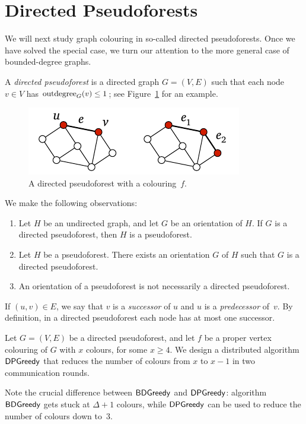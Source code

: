 \section{Directed Pseudoforests}

We will next study graph colouring in so-called directed pseudoforests. Once we have solved the special case, we turn our attention to the more general case of bounded-degree graphs.

A \emph{directed pseudoforest} is a directed graph $G = (V,E)$ such that each node $v \in V$ has $\operatorname{outdegree}_G(v) \le 1$; see Figure~\ref{fig:dp} for an example.

\begin{figure}
    \centering
    \includegraphics[page=\PDP]{figs.pdf}
    \caption{A directed pseudoforest with a colouring~$f$.}\label{fig:dp}
\end{figure}

We make the following observations:
\begin{enumerate}
    \item Let $H$ be an undirected graph, and let $G$ be an orientation of $H$. If $G$ is a directed pseudoforest, then $H$ is a pseudoforest.
    \item Let $H$ be a pseudoforest. There exists an orientation $G$ of $H$ such that $G$ is a directed pseudoforest.
    \item An orientation of a pseudoforest is not necessarily a directed pseudoforest.
\end{enumerate}
If $(u,v) \in E$, we say that $v$ is a \emph{successor} of $u$ and $u$ is a \emph{predecessor} of~$v$. By definition, in a directed pseudoforest each node has at most one successor.


\label{sec:dpgreedy}

Let $G = (V,E)$ be a directed pseudoforest, and let $f$ be a proper vertex colouring of $G$ with $x$ colours, for some $x \ge 4$. We design a distributed algorithm $\textsf{DPGreedy}$ that reduces the number of colours from $x$ to $x-1$ in two communication rounds.

Note the crucial difference between $\textsf{BDGreedy}$ and $\textsf{DPGreedy}$: algorithm $\textsf{BDGreedy}$ gets stuck at $\Delta+1$ colours, while $\textsf{DPGreedy}$ can be used to reduce the number of colours down to~$3$.


